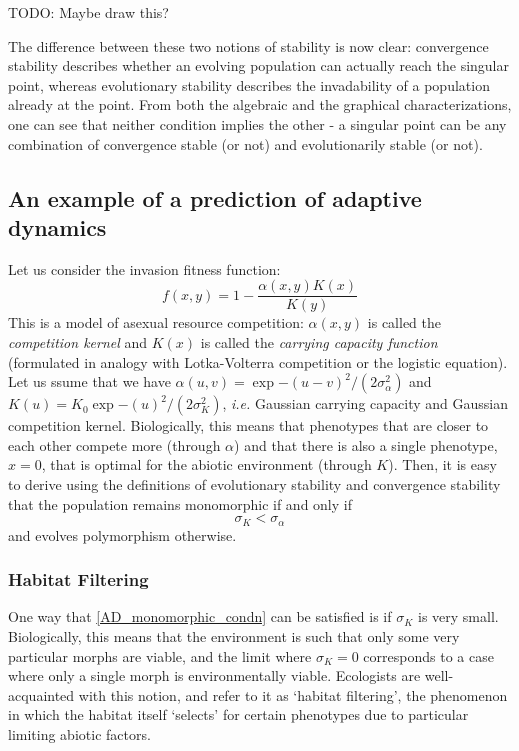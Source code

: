 {\color{red}TODO: Maybe draw this?}

The difference between these two notions of stability is now clear: convergence stability describes whether an evolving population can actually reach the singular point, whereas evolutionary stability describes the invadability of a population already at the point. From both the algebraic and the graphical characterizations, one can see that neither condition implies the other - a singular point can be any combination of convergence stable (or not) and evolutionarily stable (or not).  

\subsection{An example of a prediction of adaptive dynamics}

Let us consider the invasion fitness function:
\begin{equation}
	\label{AD_cts_logistic_invasion_fitness}
	f(x,y) = 1 - \frac{\alpha(x,y)K(x)}{K(y)}
\end{equation}
This is a model of asexual resource competition:  $\alpha(x,y)$ is called the \emph{competition kernel} and $K(x)$ is called the \emph{carrying capacity function} (formulated in analogy with Lotka-Volterra competition or the logistic equation).  Let us ssume that we have $\alpha(u,v) = \exp{-(u-v)^2/(2\sigma^{2}_{\alpha})}$ and $K(u) = K_{0}\exp{-(u)^2/(2\sigma^{2}_{K})}$, \emph{i.e.} Gaussian carrying capacity and Gaussian competition kernel. Biologically, this means that phenotypes that are closer to each other compete more (through $\alpha$) and that there is also a single phenotype, $x=0$, that is optimal for the abiotic environment (through $K$). Then, it is easy to derive using the definitions of evolutionary stability and convergence stability that the population remains monomorphic if and only if
\begin{equation}\label{AD_monomorphic_condn}
	\sigma_K<\sigma_{\alpha}
\end{equation}
and evolves polymorphism otherwise.
\subsubsection{Habitat Filtering}
One way that \ref{AD_monomorphic_condn} can be satisfied is if $\sigma_K$ is very small. Biologically, this means that the environment is such that only some very particular morphs are viable, and the limit where $\sigma_K = 0$ corresponds to a case where only a single morph is environmentally viable. Ecologists are well-acquainted with this notion, and refer to it as `habitat filtering', the phenomenon in which the habitat itself `selects' for certain phenotypes due to particular limiting abiotic factors.

